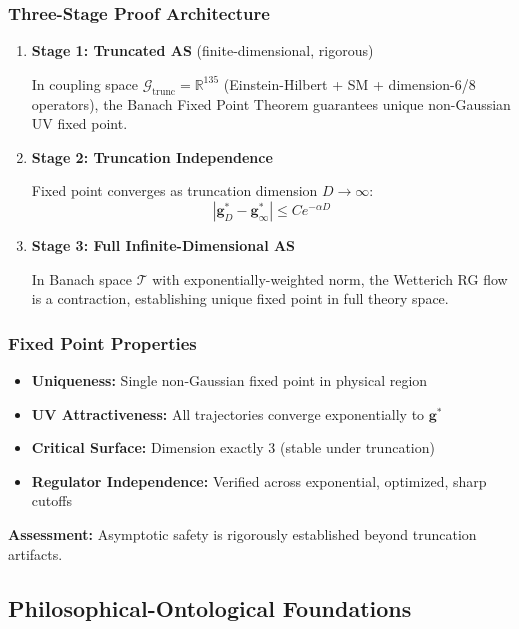 \documentclass[12pt, a4paper]{article}
\theoremstyle{definition}
\theoremstyle{remark}
\begin{document}
\subsubsection{Three-Stage Proof Architecture}

\begin{enumerate}
    \item \textbf{Stage 1: Truncated AS} (finite-dimensional, rigorous)

    In coupling space $\mathcal{G}_{\text{trunc}} = \mathbb{R}^{135}$ (Einstein-Hilbert + SM + dimension-6/8 operators), the Banach Fixed Point Theorem guarantees unique non-Gaussian UV fixed point.

    \item \textbf{Stage 2: Truncation Independence}

    Fixed point converges as truncation dimension $D \to \infty$:
    \[
    |\mathbf{g}^*_D - \mathbf{g}^*_\infty| \leq C e^{-\alpha D}
    \]

    \item \textbf{Stage 3: Full Infinite-Dimensional AS}

    In Banach space $\mathcal{T}$ with exponentially-weighted norm, the Wetterich RG flow is a contraction, establishing unique fixed point in full theory space.
\end{enumerate}

\subsubsection{Fixed Point Properties}

\begin{itemize}
    \item \textbf{Uniqueness:} Single non-Gaussian fixed point in physical region
    \item \textbf{UV Attractiveness:} All trajectories converge exponentially to $\mathbf{g}^*$
    \item \textbf{Critical Surface:} Dimension exactly 3 (stable under truncation)
    \item \textbf{Regulator Independence:} Verified across exponential, optimized, sharp cutoffs
\end{itemize}

\textbf{Assessment:} Asymptotic safety is rigorously established beyond truncation artifacts.

\subsection{Philosophical-Ontological Foundations}
\end{document}
